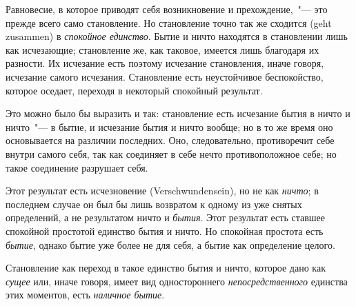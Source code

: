 Равновесие, в которое приводят себя возникновение
и прехождение,~"--- это прежде всего само становление. Но
становление точно так же сходится (geht zusammen) в
\emph{спокойное единство}. Бытие и ничто находятся в становлении
лишь как исчезающие; становление же, как таковое,
имеется лишь благодаря их разности. Их исчезание
есть поэтому исчезание становления, иначе говоря, исчезание
самого исчезания. Становление есть неустойчивое
беспокойство, которое оседает, переходя в некоторый
спокойный результат.

Это можно было бы выразить и так: становление есть
исчезание бытия в ничто и ничто~"--- в бытие, и исчезание
бытия и ничто вообще; но в то же время оно основывается
на различии последних. Оно, следовательно, противоречит
себе внутри самого себя, так как соединяет
в себе нечто противоположное себе; но такое соединение
разрушает себя.

Этот результат есть исчезновение (Verschwundensein),
но не как \emph{ничто}; в последнем случае он был бы лишь возвратом
к одному из уже снятых определений, а не результатом
ничто и \emph{бытия}. Этот результат есть ставшее
спокойной простотой единство бытия и ничто. Но спокойная
простота есть \emph{бытие}, однако бытие уже более не для
себя, а бытие как определение целого.

Становление как переход в такое единство бытия и
ничто, которое дано как \emph{сущее} или, иначе говоря, имеет
вид одностороннего \emph{непосредственного} единства этих моментов,
есть \emph{наличное бытие}.


